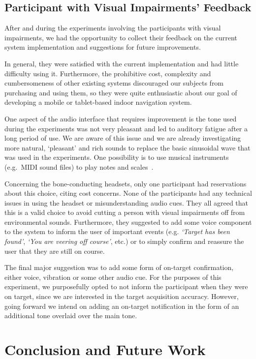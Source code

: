 \documentclass[sigconf, screen=true, anonymous=true]{acmart}
\begin{document}
\subsection{Participant with Visual Impairments' Feedback}

After and during the experiments involving the participants with visual impairments, we had the opportunity to collect their feedback on the current system implementation and suggestions for future improvements.

In general, they were satisfied with the current implementation and had little difficulty using it.
Furthermore, the prohibitive cost, complexity and cumbersomeness of other existing systems discouraged our subjects from purchasing and using them, so they were quite enthusiastic about our goal of developing a mobile or tablet-based indoor navigation system. 

One aspect of the audio interface that requires improvement is the tone used during the experiments was not very pleasant and led to auditory fatigue after a long period of use.
We are aware of this issue and we are already investigating more natural, `pleasant' and rich sounds to replace the basic sinusoidal wave that was used in the experiments.
One possibility is to use musical instruments (e.g.\ MIDI sound files) to play notes and scales~\cite{brewster1998using}.

Concerning the bone-conducting headsets, only one participant had reservations about this choice, citing cost concerns.
None of the participants had any technical issues in using the headset or misunderstanding audio cues.
They all agreed that this is a valid choice to avoid cutting a person with visual impairments off from environmental sounds.
Furthermore, they suggested to add some voice component to the system to inform the user of important events (e.g. \emph{`Target has been found'}, \emph{`You are veering off course'}, etc.) or to simply confirm and reassure the user that they are still on course.

The final major suggestion was to add some form of on-target confirmation, either voice, vibration or some other audio cue.
For the purposes of this experiment, we purposefully opted to not inform the participant when they were on target, since we are interested in the target acquisition accuracy.
However, going forward we intend on adding an on-target notification in the form of an additional tone overlaid over the main tone. 

\section{Conclusion and Future Work}\label{sec:conclusion}
\end{document}
